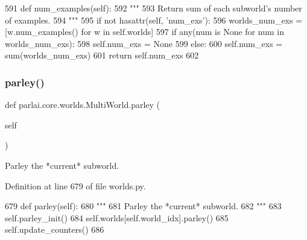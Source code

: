 \begin{DoxyCode}
591     \textcolor{keyword}{def }num\_examples(self):
592         \textcolor{stringliteral}{"""}
593 \textcolor{stringliteral}{        Return sum of each subworld's number of examples.}
594 \textcolor{stringliteral}{        """}
595         \textcolor{keywordflow}{if} \textcolor{keywordflow}{not} hasattr(self, \textcolor{stringliteral}{'num\_exs'}):
596             worlds\_num\_exs = [w.num\_examples() \textcolor{keywordflow}{for} w \textcolor{keywordflow}{in} self.worlds]
597             \textcolor{keywordflow}{if} any(num \textcolor{keywordflow}{is} \textcolor{keywordtype}{None} \textcolor{keywordflow}{for} num \textcolor{keywordflow}{in} worlds\_num\_exs):
598                 self.num\_exs = \textcolor{keywordtype}{None}
599             \textcolor{keywordflow}{else}:
600                 self.num\_exs = sum(worlds\_num\_exs)
601         \textcolor{keywordflow}{return} self.num\_exs
602 
\end{DoxyCode}
\mbox{\label{classparlai_1_1core_1_1worlds_1_1MultiWorld_aae71b8182e17a1579352a52b56614b64}} 
\subsubsection{\texorpdfstring{parley()}{parley()}}
{\footnotesize\ttfamily def parlai.\+core.\+worlds.\+Multi\+World.\+parley (\begin{DoxyParamCaption}\item[{}]{self }\end{DoxyParamCaption})}

\begin{DoxyVerb}Parley the *current* subworld.
\end{DoxyVerb}
 

Definition at line 679 of file worlds.\+py.


\begin{DoxyCode}
679     \textcolor{keyword}{def }parley(self):
680         \textcolor{stringliteral}{"""}
681 \textcolor{stringliteral}{        Parley the *current* subworld.}
682 \textcolor{stringliteral}{        """}
683         self.parley\_init()
684         self.worlds[self.world\_idx].parley()
685         self.update\_counters()
686 
\end{DoxyCode}
\mbox{\label{classparlai_1_1core_1_1worlds_1_1MultiWorld_a9f2f4de7791e3b295359039e9d26a523}} 
